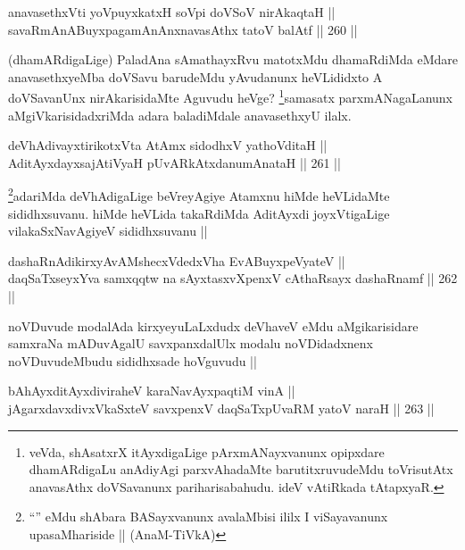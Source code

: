 \begin{shl}
anavasethxVti yoV\s puyxkatxH soV\s pi doVSoV nirAkaqtaH || \\
savaRmAnABuyxpagamAnAnxnavasAthx tatoV balAtf ||  260 || 
\end{shl}

\begin{artha}
(dhamARdigaLige) PaladAna sAmathayxRvu matotxMdu dhamaRdiMda eMdare anavasethxyeMba doVSavu barudeMdu yAvudanunx heVLididxto A doVSavanUnx nirAkarisidaMte Aguvudu heVge? \footnote{veVda, shAsatxrX itAyxdigaLige pArxmANayxvanunx opipxdare dhamARdigaLu anAdiyAgi parxvAhadaMte barutitxruvudeMdu toVrisutAtx anavasAthx doVSavanunx pariharisabahudu. ideV vAtiRkada tAtapxyaR.}samasatx parxmANagaLanunx aMgiVkarisidadxriMda adara baladiMdale anavasethxyU ilalx.
\end{artha}


\begin{shl}
deVhAdivayxtirikotxV\s ta AtAmx sidodhxV yathoVditaH || \\
AditAyxdayxsajAtiVyaH pUvARkAtxdanumAnataH ||  261 ||  
\end{shl}

\begin{artha}
\footnote{``\stext'' eMdu shAbara BASayxvanunx avalaMbisi ililx I viSayavanunx upasaMhariside || (AnaM-TiVkA)}adariMda deVhAdigaLige beVreyAgiye Atamxnu hiMde heVLidaMte sididhxsuvanu. hiMde heVLida takaRdiMda AditAyxdi joyxVtigaLige  vilakaSxNavAgiyeV sididhxsuvanu ||
\end{artha}


\begin{shl}
dashaRnAdikirxyAvAMshecxVdedxVha EvABuyxpeVyateV || \\
daqSaTxseyxYva samxqqtw na sAyxtasxvXpenxV cAthaRsayx dashaRnamf ||  262 ||  
\end{shl}

\begin{artha}
noVDuvude modalAda kirxyeyuLaLxdudx deVhaveV eMdu aMgikarisidare samxraNa mADuvAgalU savxpanxdalUlx modalu noVDidadxnenx noVDuvudeMbudu sididhxsade hoVguvudu ||
\end{artha}

\begin{shl}
bAhAyxditAyxdiviraheV karaNavAyxpaqtiM vinA ||  \\
jAgarxdavxdivxVkaSxteV savxpenxV daqSaTxpUvaRM yatoV naraH ||  263 ||  
\end{shl}

